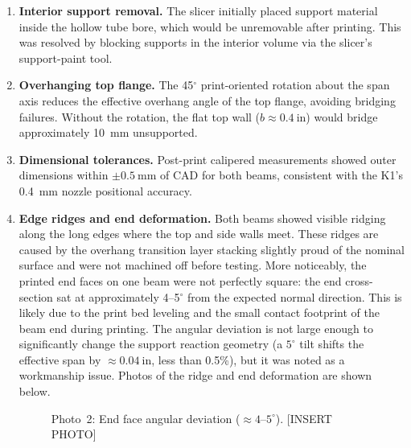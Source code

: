 \documentclass[11pt,letterpaper]{article}
\begin{document}
\begin{enumerate}[noitemsep]
  \item \textbf{Interior support removal.}  The slicer initially placed support
    material inside the hollow tube bore, which would be unremovable after
    printing.  This was resolved by blocking supports in the interior volume
    via the slicer's support-paint tool.

  \item \textbf{Overhanging top flange.}  The 45$^\circ$ print-oriented
    rotation about the span axis reduces the effective overhang angle of
    the top flange, avoiding bridging failures.  Without the rotation,
    the flat top wall ($b \approx 0.4\ \mathrm{in}$) would bridge
    approximately 10~mm unsupported.

  \item \textbf{Dimensional tolerances.}  Post-print calipered measurements
    showed outer dimensions within $\pm 0.5\ \mathrm{mm}$ of CAD for both beams,
    consistent with the K1's 0.4~mm nozzle positional accuracy.

  \item \textbf{Edge ridges and end deformation.}  Both beams showed visible
    ridging along the long edges where the top and side walls meet.  These
    ridges are caused by the overhang transition layer stacking slightly proud
    of the nominal surface and were not machined off before testing.  More
    noticeably, the printed end faces on one beam were not perfectly square:
    the end cross-section sat at approximately 4--5$^\circ$ from the expected
    normal direction.  This is likely due to the print bed leveling and the
    small contact footprint of the beam end during printing.  The angular
    deviation is not large enough to significantly change the support reaction
    geometry (a $5^\circ$ tilt shifts the effective span by $\approx 0.04\ \mathrm{in}$,
    less than 0.5\%), but it was noted as a workmanship issue.
    Photos of the ridge and end deformation are shown below.

  \begin{figure}[H]
    \centering
    \begin{minipage}[t]{0.48\textwidth}
      \centering
      \fbox{\rule{0pt}{4cm}\hspace{6cm}}
      \caption*{Photo~1: Edge ridging visible along top-to-side wall transition.
      [INSERT PHOTO]}
    \end{minipage}
    \hfill
    \begin{minipage}[t]{0.48\textwidth}
      \centering
      \fbox{\rule{0pt}{4cm}\hspace{6cm}}
      \caption*{Photo~2: End face angular deviation ($\approx4$--$5^\circ$).
      [INSERT PHOTO]}
    \end{minipage}
  \end{figure}
\end{enumerate}
\end{document}
